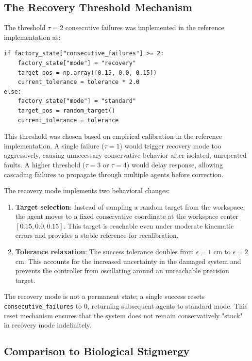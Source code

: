 \documentclass[12pt,a4paper,oneside]{report}
\begin{document}
\subsection{The Recovery Threshold Mechanism}
\label{subsec:the_recovery_threshold_mechanism}

The threshold $\tau = 2$ consecutive failures was implemented in the reference implementation as:

\begin{verbatim}
if factory_state["consecutive_failures"] >= 2:
    factory_state["mode"] = "recovery"
    target_pos = np.array([0.15, 0.0, 0.15])
    current_tolerance = tolerance * 2.0
else:
    factory_state["mode"] = "standard"
    target_pos = random_target()
    current_tolerance = tolerance
\end{verbatim}

This threshold was chosen based on empirical calibration in the reference implementation. A single failure ($\tau = 1$) would trigger recovery mode too aggressively, causing unnecessary conservative behavior after isolated, unrepeated faults. A higher threshold ($\tau = 3$ or $\tau = 4$) would delay response, allowing cascading failures to propagate through multiple agents before correction.

The recovery mode implements two behavioral changes:

\begin{enumerate}
    \item \textbf{Target selection}: Instead of sampling a random target from the workspace, the agent moves to a fixed conservative coordinate at the workspace center $[0.15, 0.0, 0.15]$. This target is reachable even under moderate kinematic errors and provides a stable reference for recalibration.
    \item \textbf{Tolerance relaxation}: The success tolerance doubles from $\epsilon = 1$ cm to $\epsilon = 2$ cm. This accounts for the increased uncertainty in the damaged system and prevents the controller from oscillating around an unreachable precision target.
\end{enumerate}

The recovery mode is not a permanent state; a single success resets \texttt{consecutive\_failures} to 0, returning subsequent agents to standard mode. This reset mechanism ensures that the system does not remain conservatively "stuck" in recovery mode indefinitely.

\subsection{Comparison to Biological Stigmergy}
\label{subsec:comparison_to_biological_stigmergy}
\end{document}
